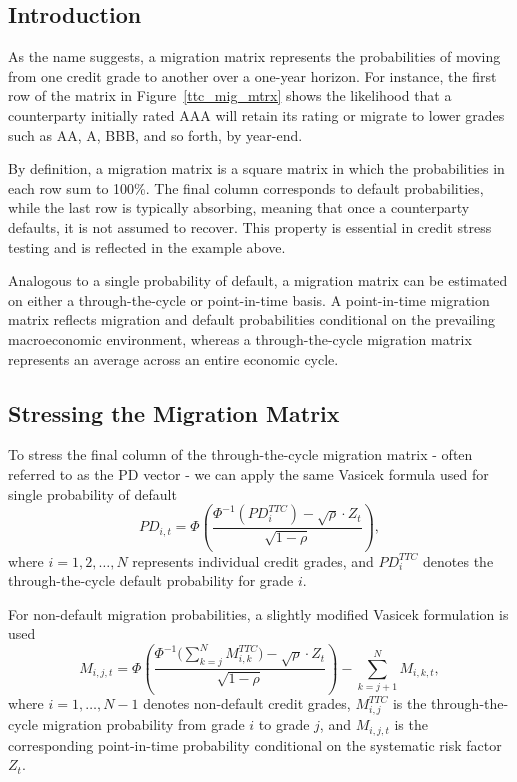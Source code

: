 \documentclass[11pt,a4paper]{article}
\begin{document}
\subsection{Introduction}

As the name suggests, a migration matrix represents the probabilities of moving from one credit grade to another over a one-year horizon. For instance, the first row of the matrix in Figure~\ref{ttc_mig_mtrx} shows the likelihood that a counterparty initially rated AAA will retain its rating or migrate to lower grades such as AA, A, BBB, and so forth, by year-end.

By definition, a migration matrix is a square matrix in which the probabilities in each row sum to 100\%. The final column corresponds to default probabilities, while the last row is typically absorbing, meaning that once a counterparty defaults, it is not assumed to recover. This property is essential in credit stress testing and is reflected in the example above.

Analogous to a single probability of default, a migration matrix can be estimated on either a through-the-cycle or point-in-time basis. A point-in-time migration matrix reflects migration and default probabilities conditional on the prevailing macroeconomic environment, whereas a through-the-cycle migration matrix represents an average across an entire economic cycle.

\subsection{Stressing the Migration Matrix}

To stress the final column of the through-the-cycle migration matrix - often referred to as the PD vector - we can apply the same Vasicek formula used for single probability of default
\begin{equation}
PD_{i,t} = \Phi \left( \frac{\Phi^{-1}(PD_i^{TTC}) - \sqrt{\rho} \cdot Z_t}{\sqrt{1 - \rho}} \right),
\end{equation}
where $i = 1, 2, \ldots, N$ represents individual credit grades, and $PD_i^{TTC}$ denotes the through-the-cycle default probability for grade $i$.

For non-default migration probabilities, a slightly modified Vasicek formulation is used
\begin{equation}
M_{i,j,t} = 
\Phi \left( 
\frac{\Phi^{-1} \Big( \sum_{k = j}^N M_{i,k}^{TTC} \Big) - \sqrt{\rho} \cdot Z_t}{\sqrt{1 - \rho}} 
\right)
- \sum_{k = j + 1}^N M_{i,k,t},
\end{equation}
where $i = 1, \ldots, N - 1$ denotes non-default credit grades, $M_{i,j}^{TTC}$ is the through-the-cycle migration probability from grade $i$ to grade $j$, and $M_{i,j,t}$ is the corresponding point-in-time probability conditional on the systematic risk factor $Z_t$.
\end{document}
